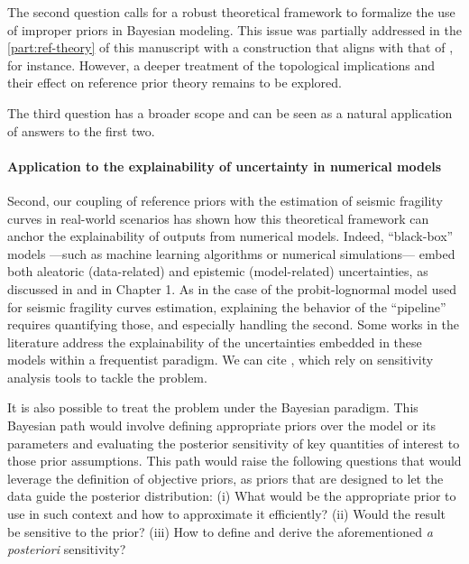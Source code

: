 The second question calls for a robust theoretical framework to formalize the use of improper priors in Bayesian modeling. This issue was partially addressed in the \cref{part:ref-theory} of this manuscript with a construction that aligns with that of \citet{bioche_approximation_2015}, for instance. However, a deeper treatment of the topological implications and their effect on reference prior theory remains to be explored.

The third question has a broader scope
and can be seen as a natural application of answers to the first two. %



\paragraph{Application to the explainability of uncertainty in numerical models}

Second, our coupling of reference priors with the estimation of seismic fragility curves in real-world scenarios has shown how this theoretical framework can anchor the explainability of outputs from numerical models. Indeed, ``black-box'' models ---such as machine learning algorithms or numerical simulations--- embed both aleatoric (data-related) and epistemic (model-related) uncertainties, as discussed in \cite{hullermeier_aleatoric_2019} and in Chapter 1.
As in the case of the probit-lognormal model used for seismic fragility curves estimation, explaining the behavior of the ``pipeline'' requires quantifying those, and especially handling the second. %
Some works in the literature address the explainability of the uncertainties embedded in these
models within a frequentist paradigm. We can cite
\cite{il_idrissi_quantile-constrained_2024,wimmer_quantifying_2023}, which rely on
sensitivity analysis tools to tackle the problem.

It is also possible to treat the problem under the Bayesian paradigm.
This Bayesian path would involve defining appropriate priors over the model or its parameters and evaluating the posterior sensitivity of key quantities of interest to those prior assumptions. This path would raise the following questions that would leverage the definition
of objective priors, as priors that are designed to let the data guide the posterior distribution:
(i) What would be the appropriate prior to use in such context
and how to approximate it efficiently? (ii) 
Would the result be sensitive to the prior?
(iii) How to define and derive the aforementioned \emph{a posteriori} sensitivity?

